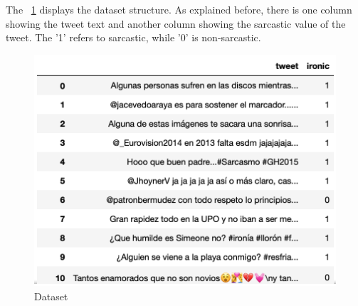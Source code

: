 The ~\cref{fig:dataset} displays the dataset structure. As explained before, there is one column showing the tweet text and another column showing the sarcastic value of the tweet. The '1' refers to sarcastic, while '0' is non-sarcastic.
\begin{figure}
	\includegraphics[width=\linewidth]{img/dataset.png}
	\caption{Dataset}
	\label{fig:dataset}
\end{figure}

